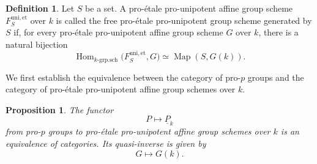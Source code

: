 \documentclass[12pt,a4]{amsart}
\newtheorem{prop}[claim]{Proposition}
\theoremstyle{definition}
\newtheorem{defn}[claim]{Definition}
\begin{document}
\begin{defn} \label{free pro}
	Let \(S\) be a set. A pro-\'etale pro-unipotent affine group scheme
	\(F^{\mathrm{uni,et}}_S\) over \(k\) is called the free pro-\'etale
	pro-unipotent group scheme generated by \(S\) if, for every pro-\'etale
	pro-unipotent affine group scheme \(G\) over \(k\), there is a natural
	bijection
	\[
	\operatorname{Hom}_{k\text{-grp.sch}}
	\bigl(F^{\mathrm{uni,et}}_S,G\bigr)
	\simeq
	\operatorname{Map}(S,G(k)).
	\]
\end{defn}
We first establish the equivalence between the category of pro-\(p\) groups
and the category of pro-\'etale pro-unipotent affine group schemes over \(k\).
\begin{prop}\label{prop:proetale-unipotent-prop-groups}
	The
	functor
	\[
	P \longmapsto \underline{P}_k
	\]
	from pro-\(p\) groups to pro-\'{e}tale pro-unipotent affine group schemes over
	\(k\) is an equivalence of categories. Its quasi-inverse is given by
	\[
	G \longmapsto G(k).
	\]
\end{prop}
\end{document}
